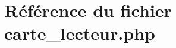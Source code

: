 \hypertarget{carte__lecteur_8php}{
\section{R\'{e}f\'{e}rence du fichier carte\_\-lecteur.php}
\label{carte__lecteur_8php}
}
